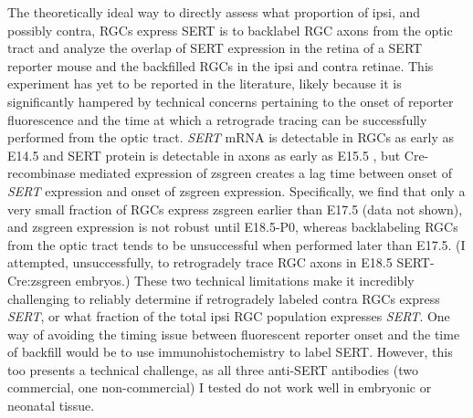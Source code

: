 The theoretically ideal way to directly assess what proportion of ipsi, and possibly contra, RGCs express SERT is to backlabel RGC axons from the optic tract and analyze the overlap of SERT expression in the retina of a SERT reporter mouse and the backfilled RGCs in the ipsi and contra retinae.
This experiment has yet to be reported in the literature, likely because it is significantly hampered by technical concerns pertaining to the onset of reporter fluorescence and the time at which a retrograde tracing can be successfully performed from the optic tract.
\emph{SERT} mRNA is detectable in RGCs as early as E14.5 \cite{garcia2010zic2} and SERT protein is detectable in axons as early as E15.5 \cite{upton1999excess}, but Cre-recombinase mediated expression of zsgreen creates a lag time between onset of \emph{SERT} expression and onset of zsgreen expression.
Specifically, we find that only a very small fraction of RGCs express zsgreen earlier than E17.5 (data not shown), and zsgreen expression is not robust until E18.5-P0, whereas backlabeling RGCs from the optic tract tends to be unsuccessful when performed later than E17.5.
(I attempted, unsuccessfully, to retrogradely trace RGC axons in E18.5 SERT-Cre:zsgreen embryos.)
These two technical limitations make it incredibly challenging to reliably determine if retrogradely labeled contra RGCs express \emph{SERT}, or what fraction of the total ipsi RGC population expresses \emph{SERT}.
One way of avoiding the timing issue between fluorescent reporter onset and the time of backfill would be to use immunohistochemistry to label SERT.
However, this too presents a technical challenge, as all three anti-SERT antibodies (two commercial, one non-commercial) I tested do not work well in embryonic or neonatal tissue.


